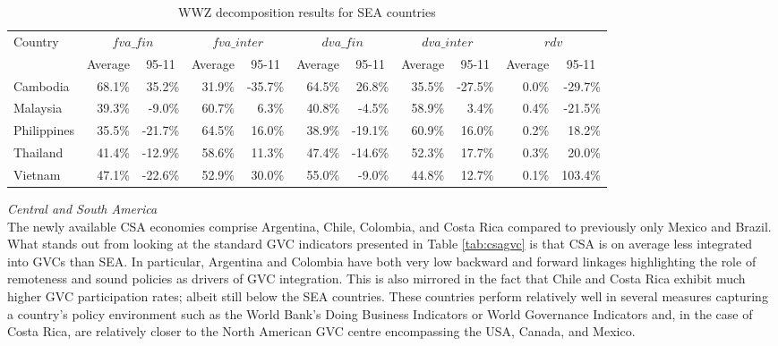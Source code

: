 \documentclass[11pt,a4paper]{article}
\begin{document}
\begin{table}[!h]\small
  \centering
  \caption{WWZ decomposition results for SEA countries}
  \hspace*{-2.7cm}
    \begin{tabular}{lrrrrrrrrrr} 
    \toprule
    \multicolumn{1}{l}{\multirow{1}[0]{*}{Country}} & \multicolumn{2}{c}{$fva\_fin$} & \multicolumn{2}{c}{$fva\_inter$} & \multicolumn{2}{c}{$dva\_fin$} & \multicolumn{2}{c}{$dva\_inter$} & \multicolumn{2}{c}{$rdv$} \\
    \multicolumn{1}{l}{} & \multicolumn{1}{c}{Average} & \multicolumn{1}{c}{95-11} &
\multicolumn{1}{c}{Average} & \multicolumn{1}{c}{95-11} & \multicolumn{1}{c}{Average} & \multicolumn{1}{c}{95-11} & \multicolumn{1}{c}{Average} & \multicolumn{1}{c}{95-11} & \multicolumn{1}{c}{Average} & \multicolumn{1}{c}{95-11} \\
  \midrule
    Cambodia & 68.1\% & 35.2\% & 31.9\% & -35.7\% & 64.5\% & 26.8\% & 35.5\% & -27.5\% & 0.0\% & -29.7\% \\
    Malaysia & 39.3\% & -9.0\% & 60.7\% & 6.3\% & 40.8\% & -4.5\% & 58.9\% & 3.4\% & 0.4\% & -21.5\% \\
    Philippines & 35.5\% & -21.7\% & 64.5\% & 16.0\% & 38.9\% & -19.1\% & 60.9\% & 16.0\% & 0.2\% & 18.2\% \\
    Thailand & 41.4\% & -12.9\% & 58.6\% & 11.3\% & 47.4\% & -14.6\% & 52.3\% & 17.7\% & 0.3\% & 20.0\% \\
    Vietnam & 47.1\% & -22.6\% & 52.9\% & 30.0\% & 55.0\% & -9.0\% & 44.8\% & 12.7\% & 0.1\% & 103.4\% \\
    \bottomrule
    \end{tabular}
  \label{tab:seawwz}
\end{table}


\textit{Central and South America}\\
The newly available CSA economies comprise Argentina, Chile, Colombia, and Costa Rica compared to previously only Mexico and Brazil. What stands out from looking at the standard GVC indicators presented in Table \ref{tab:csagvc} is that CSA is on average less integrated into GVCs than SEA. In particular, Argentina and Colombia have both very low backward and forward linkages highlighting the role of remoteness and sound policies as drivers of GVC integration. This is also mirrored in the fact that Chile and Costa Rica exhibit much higher GVC participation rates; albeit still below the SEA countries. These countries perform relatively well in several measures capturing a country's policy environment such as the World Bank's Doing Business Indicators or World Governance Indicators and, in the case of Costa Rica, are relatively closer to the North American GVC centre encompassing the USA, Canada, and Mexico. 
\end{document}

